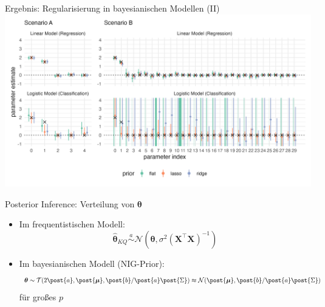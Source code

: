 \documentclass[
  ignorenonframetext,
  aspectratio=169,
]{beamer}
\newcommand{\bX}{\bm{X}}
\newcommand{\Ncal}{\mathcal{N}}
\newcommand{\Tcal}{\mathcal{T}}
\newcommand{\ssd}{\sigma^2}
\newcommand{\btheta}{\bm{\theta}}
\newcommand{\hbtheta}{\hat{\bm{\theta}}}
\newcommand{\mupo}{\post{\bm{\mu}}}
\newcommand{\Sdpo}{\post{\Sigma}}
\newcommand{\apo}{\post{a}}
\newcommand{\bpo}{\post{b}}
\begin{document}
\begin{frame}{Ergebnis: Regularisierung in bayesianischen Modellen (II)}
\protect{}\label{ergebnis-regularisierung-in-bayesianischen-modellen-ii}
\includegraphics[width=\linewidth,height=0.8\textheight,keepaspectratio]{../figures/reg_all.png}
\end{frame}

\begin{frame}{Posterior Inference: Verteilung von \(\btheta\)}
\protect{}\label{posterior-inference-verteilung-von-btheta}
\begin{itemize}
\item
  Im frequentistischen Modell:
  \[\hbtheta_{KQ} \overset{a}{\sim} \Ncal(\btheta, \ssd (\bX^\top \bX)^{-1})\]
\item
  Im bayesianischen Modell (NIG-Prior): \[
  \btheta \sim \Tcal(2 \apo, \mupo, \bpo / \apo \Sdpo) \approx \Ncal(\mupo, \bpo / \apo \Sdpo)\]
  für großes \(p\)
\end{itemize}
\end{frame}
\end{document}
